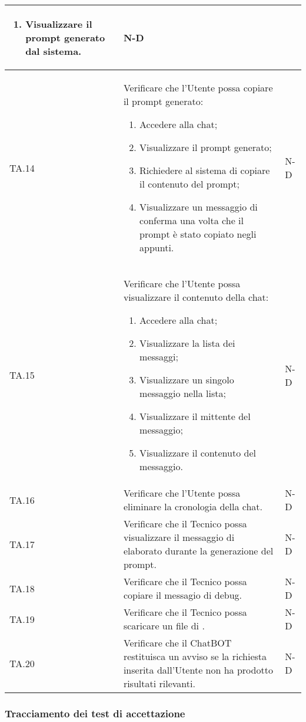 \begin{adjustwidth}{-0.5cm}{-0.5cm}
\begin{longtable}{|P{1.5cm}|>{\raggedright}P{9.5cm}|>{\arraybackslash}P{1.5cm}|}
\begin{enumerate}
			\item Visualizzare il prompt generato dal sistema.
		\end{enumerate}
		& N-D \\
		\hline TA.14 & Verificare che l'Utente possa copiare il prompt generato:
		\begin{enumerate}
			\item Accedere alla chat;
			\item Visualizzare il prompt generato;
			\item Richiedere al sistema di copiare il contenuto del prompt;
			\item Visualizzare un messaggio di conferma una volta che il prompt è stato copiato negli appunti.
		\end{enumerate}
		& N-D \\
		\hline TA.15 & Verificare che l'Utente possa visualizzare il contenuto della chat:
		\begin{enumerate}
			\item Accedere alla chat;
			\item Visualizzare la lista dei messaggi;
			\item Visualizzare un singolo messaggio nella lista;
			\item Visualizzare il mittente del messaggio;
			\item Visualizzare il contenuto del messaggio.
		\end{enumerate}
		& N-D \\
		\hline TA.16 & Verificare che l'Utente possa eliminare la cronologia della chat. & N-D \\
		\hline TA.17 & Verificare che il Tecnico possa visualizzare il messaggio di  elaborato durante la generazione del prompt. & N-D \\
		\hline TA.18 & Verificare che il Tecnico possa copiare il messagio di debug. & N-D \\
		\hline TA.19 & Verificare che il Tecnico possa scaricare un file di . & N-D \\
		\hline TA.20 & Verificare che il ChatBOT restituisca un avviso se la richiesta inserita dall'Utente non ha prodotto risultati rilevanti. & N-D \\
	\end{longtable}
\end{adjustwidth}
\egroup

\clearpage
\subsubsection{Tracciamento dei test di accettazione}

